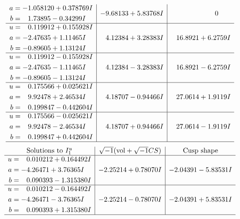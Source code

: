 \documentclass[1p]{elsarticle_modified}
\theoremstyle{definition}
\newcommand{\I}{\sqrt{-1}}
\begin{document}
$$\begin{array}{c|c|c}
\begin{aligned}
a &= -1.058120 + 0.378769 I \\
b &= \phantom{-}1.73895 - 0.34299 I\end{aligned}
 & -9.68133 + 5.83768 I & \phantom{-0.000000 } 0 \\ \hline\begin{aligned}
u &= \phantom{-}0.119912 + 0.155928 I \\
a &= -2.47635 + 1.11465 I \\
b &= -0.89605 + 1.13124 I\end{aligned}
 & \phantom{-}4.12384 + 3.28383 I & \phantom{-}16.8921 + 6.2759 I \\ \hline\begin{aligned}
u &= \phantom{-}0.119912 - 0.155928 I \\
a &= -2.47635 - 1.11465 I \\
b &= -0.89605 - 1.13124 I\end{aligned}
 & \phantom{-}4.12384 - 3.28383 I & \phantom{-}16.8921 - 6.2759 I \\ \hline\begin{aligned}
u &= \phantom{-}0.175566 + 0.025621 I \\
a &= \phantom{-}9.92478 + 2.46534 I \\
b &= \phantom{-}0.199847 - 0.442604 I\end{aligned}
 & \phantom{-}4.18707 - 0.94466 I & \phantom{-}27.0614 + 1.9119 I \\ \hline\begin{aligned}
u &= \phantom{-}0.175566 - 0.025621 I \\
a &= \phantom{-}9.92478 - 2.46534 I \\
b &= \phantom{-}0.199847 + 0.442604 I\end{aligned}
 & \phantom{-}4.18707 + 0.94466 I & \phantom{-}27.0614 - 1.9119 I\\
 \hline 
 \end{array}$$\newpage$$\begin{array}{c|c|c}  
\text{Solutions to }I^u_{1}& \I (\text{vol} + \sqrt{-1}CS) & \text{Cusp shape}\\
 \hline 
\begin{aligned}
u &= \phantom{-}0.010212 + 0.164492 I \\
a &= -4.26471 + 3.76365 I \\
b &= \phantom{-}0.090393 - 1.315380 I\end{aligned}
 & -2.25214 + 0.78070 I & -2.04391 - 5.83531 I \\ \hline\begin{aligned}
u &= \phantom{-}0.010212 - 0.164492 I \\
a &= -4.26471 - 3.76365 I \\
b &= \phantom{-}0.090393 + 1.315380 I\end{aligned}
 & -2.25214 - 0.78070 I & -2.04391 + 5.83531 I\\
 \hline 
 \end{array}$$\newpage\newpage\renewcommand{\arraystretch}{1}
\end{document}
